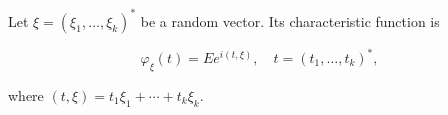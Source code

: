 Let $\xi = (\xi_1, \ldots, \xi_k)^*$ be a random vector. Its characteristic function is

$$\varphi_\xi(t) = E e^{i(t, \xi)}, \quad t = (t_1, \ldots, t_k)^*,$$

where $(t, \xi) = t_1 \xi_1 + \cdots + t_k \xi_k$.
